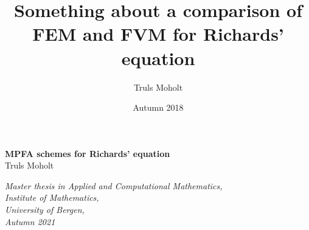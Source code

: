 \documentclass[12pt]{book}
\author{Truls Moholt}
\title{\vspace{-3.0cm}Something about a comparison of FEM and FVM for Richards' equation}
\date{Autumn 2018}
\numberwithin{equation}{chapter}
\theoremstyle{plain}
\begin{document}
\titlepage
\begin{center}
{\bf \LARGE MPFA schemes for Richards' equation}\\
\vspace{10\in}
\vspace{150\in}
{\large Truls Moholt\\ \vspace{30\in}}

\vspace*{\fill}
\it{Master thesis in Applied and Computational Mathematics, \\Institute of Mathematics, \\University of Bergen, \\Autumn 2021}
\end{center}
\tableofcontents
\newpage





%






\end{document}
